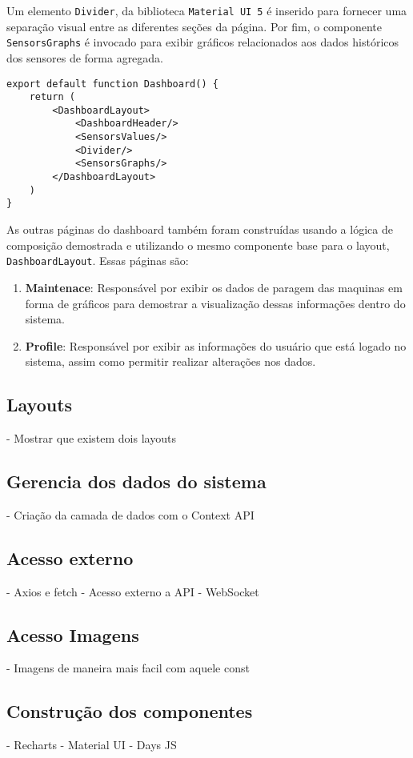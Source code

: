 Um elemento \texttt{Divider}, da biblioteca \texttt{Material UI 5} é inserido para fornecer uma separação visual entre as diferentes seções da página. Por fim, o componente \texttt{SensorsGraphs} é invocado para exibir gráficos relacionados aos dados históricos dos sensores de forma agregada.

\begin{verbatim}
export default function Dashboard() {
    return (
        <DashboardLayout>
            <DashboardHeader/>
            <SensorsValues/>
            <Divider/>
            <SensorsGraphs/>
        </DashboardLayout>
    )
}
\end{verbatim}

As outras páginas do dashboard também foram construídas usando a lógica de composição demostrada e utilizando o mesmo componente base para o layout, \texttt{DashboardLayout}. Essas páginas são:
\begin{enumerate}
    \item \textbf{Maintenace}: Responsável por exibir os dados de paragem das maquinas em forma de gráficos para demostrar a visualização dessas informações dentro do sistema. %
    \item \textbf{Profile}: Responsável por exibir as informações do usuário que está logado no sistema, assim como permitir realizar alterações nos dados. %
\end{enumerate}


\subsection{Layouts}\label{subsec:}
- Mostrar que existem dois layouts

\subsection{Gerencia dos dados do sistema}\label{subsec:}
- Criação da camada de dados com o Context API

\subsection{Acesso externo}\label{subsec:}
- Axios e fetch
- Acesso externo a API
- WebSocket

\subsection{Acesso Imagens}\label{subsec:}
- Imagens de maneira mais facil com aquele const 

\subsection{Construção dos componentes}\label{subsec:}
- Recharts
- Material UI
- Days JS